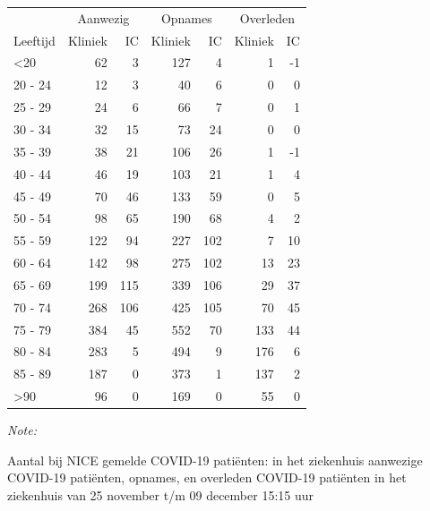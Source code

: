 \documentclass[
  english,
  man,floatsintext]{apa6}
\begin{document}
\begin{table}
\centering\begingroup\fontsize{10}{12}\selectfont

\begin{threeparttable}
\begin{tabular}{lrrrrrr}
\toprule
\multicolumn{1}{c}{ } & \multicolumn{2}{c}{Aanwezig} & \multicolumn{2}{c}{Opnames} & \multicolumn{2}{c}{Overleden} \\
\cmidrule(l{3pt}r{3pt}){2-3} \cmidrule(l{3pt}r{3pt}){4-5} \cmidrule(l{3pt}r{3pt}){6-7}
Leeftijd & Kliniek & IC & Kliniek & IC & Kliniek & IC\\
\midrule
<20 & 62 & 3 & 127 & 4 & 1 & -1\\
20 - 24 & 12 & 3 & 40 & 6 & 0 & 0\\
25 - 29 & 24 & 6 & 66 & 7 & 0 & 1\\
30 - 34 & 32 & 15 & 73 & 24 & 0 & 0\\
35 - 39 & 38 & 21 & 106 & 26 & 1 & -1\\
40 - 44 & 46 & 19 & 103 & 21 & 1 & 4\\
45 - 49 & 70 & 46 & 133 & 59 & 0 & 5\\
50 - 54 & 98 & 65 & 190 & 68 & 4 & 2\\
55 - 59 & 122 & 94 & 227 & 102 & 7 & 10\\
60 - 64 & 142 & 98 & 275 & 102 & 13 & 23\\
65 - 69 & 199 & 115 & 339 & 106 & 29 & 37\\
70 - 74 & 268 & 106 & 425 & 105 & 70 & 45\\
75 - 79 & 384 & 45 & 552 & 70 & 133 & 44\\
80 - 84 & 283 & 5 & 494 & 9 & 176 & 6\\
85 - 89 & 187 & 0 & 373 & 1 & 137 & 2\\
>90 & 96 & 0 & 169 & 0 & 55 & 0\\
\bottomrule
\end{tabular}
\begin{tablenotes}
\item \textit{Note: } 
\item Aantal bij NICE gemelde COVID-19 patiënten: in het ziekenhuis aanwezige COVID-19 patiënten, opnames, en overleden COVID-19 patiënten in het ziekenhuis van 25 november t/m 09 december 15:15 uur
\end{tablenotes}
\end{threeparttable}
\endgroup{}
\end{table}

\newpage
\end{document}
